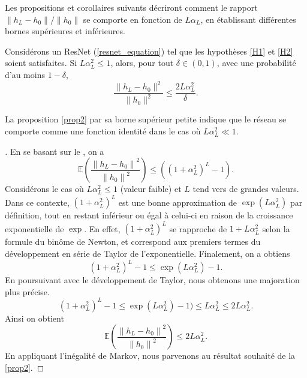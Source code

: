 Les propositions et corollaires suivants décriront comment le rapport ${\left\| h_L - h_0 \right\|} / {\left\| h_0 \right\|}$ se comporte en fonction de $L\alpha_L$, en établissant différentes bornes supérieures et inférieures.


\begin{proposition}\label{prop2}
    Considérons un ResNet (\ref{resnet_equation}) tel que les hypothèses \ref{H1} et \ref{H2} soient satisfaites.
    Si \( L\alpha_L^2 \leq 1 \), alors, pour tout \( \delta \in (0, 1) \), avec une probabilité d'au moins \( 1 - \delta \),
    \[
        \frac{\|h_L - h_0\|^2}{\|h_0\|^2} \leq \frac{2L\alpha_L^2}{\delta}
    .\]
\end{proposition}
La proposition \ref{prop2} par sa borne supérieur petite indique que le réseau se comporte comme une fonction identité dans le cas où $ L \alpha ^2 _L \ll 1 $.

\begin{proof}[]
    En se basant sur le , on a 
    \[
        \mathbb{E}( \frac{\left\| h_L - h_0 \right\| ^2 }{\left\| h_0 \right\| ^2}) \leq ((1 + \alpha _L ^2 ) ^L - 1 )
    .\]
    Considérons le cas où $L \alpha_L^2 \leq 1$ (valeur faible) et $L$ tend vers de grandes valeurs. Dans ce contexte, $(1 + \alpha_L^2)^L$ est une bonne approximation de $\exp(L \alpha_L^2)$ par définition, tout en restant inférieur ou égal à celui-ci en raison de la croissance exponentielle de $\exp$. En effet, $(1 + \alpha_L^2)^L$ se rapproche de $1 + L \alpha_L^2$ selon la formule du binôme de Newton, et correspond aux premiers termes du développement en série de Taylor de l'exponentielle. Finalement, on a obtiens
    \[
        (1 + \alpha _L ^2)^L -1 \leq \exp (L \alpha _L ^2) - 1
    .\]
    En poursuivant avec le développement de Taylor, nous obtenons une majoration plus précise.
    \[
        (1 + \alpha _L ^2)^L -1 \leq \exp (L \alpha _L ^2) - 1) \leq L \alpha _L ^2 \leq 2 L \alpha _L ^2
    .\]
    Ainsi on obtient 
    \[
        \mathbb{E}( \frac{\left\| h_L - h_0 \right\| ^2 }{\left\| h_0 \right\| ^2}) \leq 2 L \alpha _L ^2
    .\]
    En appliquant l'inégalité de Markov, nous parvenons au résultat souhaité de la \cref{prop2}.
\end{proof}



